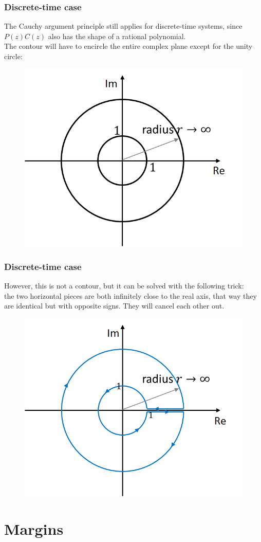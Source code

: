 \begin{frame}
	\frametitle{Discrete-time case}
	The Cauchy argument principle still applies for discrete-time systems, since $P(z)C(z)$ also has the shape of a rational polynomial.\\
	The contour will have to encircle the entire complex plane except for the unity circle:
	\vspace{-4ex}
	\begin{figure}
		\includegraphics[width=0.55\linewidth]{discrete}
	\end{figure}
\end{frame}

\begin{frame}
	\frametitle{Discrete-time case}
	However, this is not a contour, but it can be solved with the following trick:\\
	the two horizontal pieces are both infinitely close to the real axis, that way they are identical but with opposite signs. They will cancel each other out.
	\vspace{-2ex}
	\begin{figure}
		\includegraphics[width=0.5\linewidth]{discrete2}
	\end{figure}
\end{frame}

\section{Margins}


